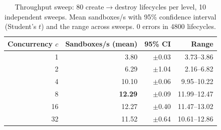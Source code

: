 \begin{table}[t]
\centering
\caption{Throughput sweep: 80 create$\rightarrow$destroy lifecycles per level, 10 independent sweeps. Mean sandboxes/s with 95\% confidence interval (Student's $t$) and the range across sweeps. 0 errors in 4800 lifecycles.}
\label{tab:throughput-linux}
\footnotesize
\begin{tabular}{@{}rrrr@{}}
\toprule
Concurrency $c$ & Sandboxes/s (mean) & 95\% CI & Range \\
\midrule
1 & {3.80} & $\pm$0.03 & 3.73--3.86 \\
2 & {6.29} & $\pm$1.04 & 2.16--6.82 \\
4 & {10.10} & $\pm$0.06 & 9.95--10.22 \\
8 & \textbf{12.29} & $\pm$0.09 & 11.99--12.47 \\
16 & {12.27} & $\pm$0.40 & 11.47--13.02 \\
32 & {11.52} & $\pm$0.64 & 10.61--12.86 \\
\bottomrule
\end{tabular}
\end{table}
